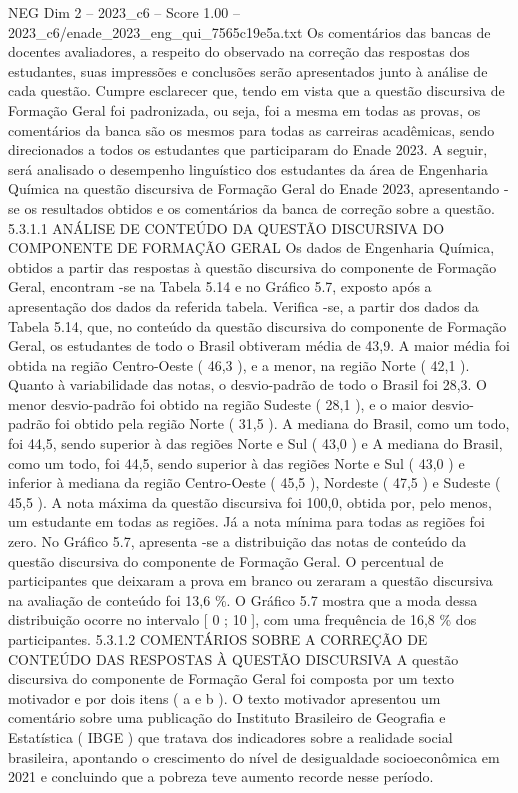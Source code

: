 \begin{textsample}{NEG Dim 2 – 2023\_c6 – Score 1.00 – 2023\_c6/enade\_2023\_eng\_qui\_7565c19e5a.txt}
Os comentários das bancas de docentes avaliadores, a respeito do observado na correção das respostas dos estudantes, suas impressões e conclusões serão apresentados junto à análise de cada questão.
Cumpre esclarecer que, tendo em vista que a questão discursiva de Formação Geral foi padronizada, ou seja, foi a mesma em todas as provas, os comentários da banca são os mesmos para todas as carreiras acadêmicas, sendo direcionados a todos os estudantes que participaram do Enade 2023.
A seguir, será analisado o desempenho linguístico dos estudantes da área de Engenharia Química na questão discursiva de Formação Geral do Enade 2023, apresentando -se os resultados obtidos e os comentários da banca de correção sobre a questão. 5.3.1.1 ANÁLISE DE CONTEÚDO DA QUESTÃO DISCURSIVA DO COMPONENTE DE FORMAÇÃO GERAL Os dados de Engenharia Química, obtidos a partir das respostas à questão discursiva do componente de Formação Geral, encontram -se na Tabela 5.14 e no Gráfico 5.7, exposto após a apresentação dos dados da referida tabela.
Verifica -se, a partir dos dados da Tabela 5.14, que, no conteúdo da questão discursiva do componente de Formação Geral, os estudantes de todo o Brasil obtiveram média de 43,9.
A maior média foi obtida na região Centro-Oeste ( 46,3 ), e a menor, na região Norte ( 42,1 ).
Quanto à variabilidade das notas, o desvio-padrão de todo o Brasil foi 28,3.
O menor desvio-padrão foi obtido na região Sudeste ( 28,1 ), e o maior desvio-padrão foi obtido pela região Norte ( 31,5 ).
A mediana do Brasil, como um todo, foi 44,5, sendo superior à das regiões Norte e Sul ( 43,0 ) e A mediana do Brasil, como um todo, foi 44,5, sendo superior à das regiões Norte e Sul ( 43,0 ) e inferior à mediana da região Centro-Oeste ( 45,5 ), Nordeste ( 47,5 ) e Sudeste ( 45,5 ).
A nota máxima da questão discursiva foi 100,0, obtida por, pelo menos, um estudante em todas as regiões.
Já a nota mínima para todas as regiões foi zero.
No Gráfico 5.7, apresenta -se a distribuição das notas de conteúdo da questão discursiva do componente de Formação Geral.
O percentual de participantes que deixaram a prova em branco ou zeraram a questão discursiva na avaliação de conteúdo foi 13,6 \%.
O Gráfico 5.7 mostra que a moda dessa distribuição ocorre no intervalo [ 0 ; 10 ], com uma frequência de 16,8 \% dos participantes. 5.3.1.2 COMENTÁRIOS SOBRE A CORREÇÃO DE CONTEÚDO DAS RESPOSTAS À QUESTÃO DISCURSIVA A questão discursiva do componente de Formação Geral foi composta por um texto motivador e por dois itens ( a e b ).
O texto motivador apresentou um comentário sobre uma publicação do Instituto Brasileiro de Geografia e Estatística ( IBGE ) que tratava dos indicadores sobre a realidade social brasileira, apontando o crescimento do nível de desigualdade socioeconômica em 2021 e concluindo que a pobreza teve aumento recorde nesse período.

\end{textsample}
